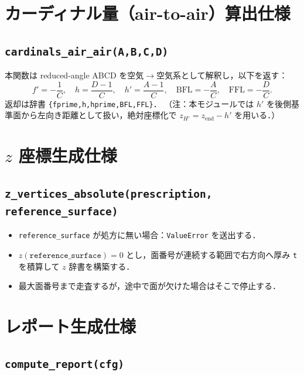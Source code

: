 \documentclass[a4paper,11pt]{jsarticle} %
\begin{document}
\section{カーディナル量（air-to-air）算出仕様}
\subsection{\texttt{cardinals\_air\_air(A,B,C,D)}}
本関数は reduced-angle ABCD を空気$\rightarrow$空気系として解釈し，以下を返す：
\[
f'=-\frac{1}{C},\quad
h=\frac{D-1}{C},\quad
h'=\frac{A-1}{C},\quad
\mathrm{BFL}=-\frac{A}{C},\quad
\mathrm{FFL}=-\frac{D}{C}.
\]
返却は辞書 \texttt{\{fprime,h,hprime,BFL,FFL\}}．
（注：本モジュールでは $h'$ を後側基準面から左向き距離として扱い，絶対座標化で $z_{H'}=z_{\mathrm{end}}-h'$ を用いる．）

\section{$z$ 座標生成仕様}
\subsection{\texttt{z\_vertices\_absolute(prescription, reference\_surface)}}
\begin{itemize}
  \item \texttt{reference\_surface} が処方に無い場合：\texttt{ValueError} を送出する．
  \item $z(\texttt{reference\_surface})=0$ とし，面番号が連続する範囲で右方向へ厚み \texttt{t} を積算して $z$ 辞書を構築する．
  \item 最大面番号まで走査するが，途中で面が欠けた場合はそこで停止する．
\end{itemize}

\section{レポート生成仕様}
\subsection{\texttt{compute\_report(cfg)}}
\end{document}
